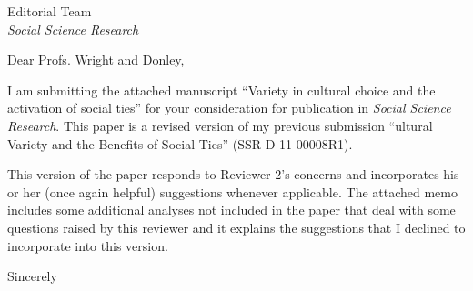 \documentclass[a4paper,12pt]{letter}
\begin{document}
\begin{letter}{Editorial Team \\ \emph{Social Science Research}}

\opening{Dear Profs. Wright and Donley,} %

I am submitting the attached manuscript ``Variety in cultural choice and the activation of social ties'' for your consideration for publication in \emph{Social Science Research}. This paper is a revised version of my previous submission  ``ultural Variety and the Benefits of Social Ties'' (SSR-D-11-00008R1).  

This version of the paper responds to Reviewer 2's concerns and incorporates his or her (once again helpful) suggestions whenever applicable. The attached memo includes some additional analyses not included in the paper that deal with some questions raised by this reviewer and it explains the suggestions that I declined to incorporate into this version.

\closing{Sincerely} %


\end{letter}
\end{document}
